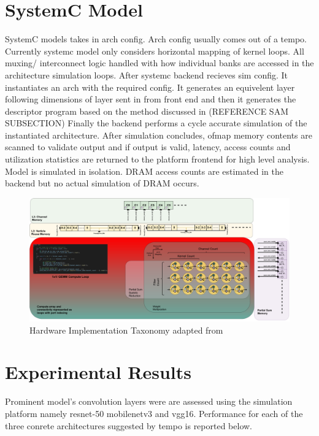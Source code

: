 \section{SystemC Model}
\label{chap:hero:sim_platform:sysc_side}

SystemC models takes in arch config. Arch config usually comes out of a tempo.
Currently systemc model only considers horizontal mapping of kernel loops. All
muxing/ interconnect logic handled with how individual banks are accessed in the
architecture simulation loops. After systemc backend recieves sim config. It
instantiates an arch with the required config. It generates an equivelent layer
following dimensions of layer sent in from front end and then it generates the
descriptor program based on the method discussed in (REFERENCE SAM SUBSECTION)
Finally the backend performs a cycle accurate simulation of the instantiated
architecture. After simulation concludes, ofmap memory contents are scanned to
validate output and if output is valid, latency, access counts and utilization
statistics are returned to the platform frontend for high level analysis. Model
is simulated in isolation. DRAM access counts are estimated in the backend but
no actual simulation of DRAM occurs.

\begin{figure}[ht]
    \centering
    \includegraphics[scale=0.58]{fig/hero-t-sysc.pdf}
    \caption{Hardware Implementation Taxonomy adapted from \cite{maestro}}
    \label{fig:hw_taxonomy}
\end{figure}


\section{Experimental Results}
\label{chap:hero:sim_platform:cigar_side}

Prominent model's convolution layers were are assessed using the simulation platform  
namely resnet-50 mobilenetv3 and vgg16. Performance for each of the three conrete
architectures suggested by tempo is reported below.